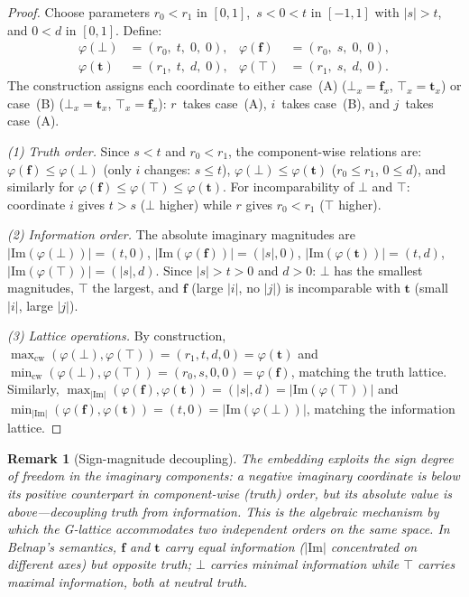 \documentclass[11pt,a4paper]{article}
\newtheorem{remark}[theorem]{Remark}
\begin{document}
\begin{proof}
Choose parameters $r_0 < r_1$ in $[0,1]$, $\, s < 0 < t$ in
$[-1,1]$ with $|s| > t$, and $0 < d$ in $[0,1]$. Define:
\begin{align*}
\varphi(\bot) &= (r_0,\; t,\; 0,\; 0), &
\varphi(\mathbf{f}) &= (r_0,\; s,\; 0,\; 0), \\
\varphi(\mathbf{t}) &= (r_1,\; t,\; d,\; 0), &
\varphi(\top) &= (r_1,\; s,\; d,\; 0).
\end{align*}
The construction assigns each coordinate to either case~(A)
($\bot_x = \mathbf{f}_x$, $\top_x = \mathbf{t}_x$) or case~(B)
($\bot_x = \mathbf{t}_x$, $\top_x = \mathbf{f}_x$):
\emph{$r$}~takes case~(A), \emph{$i$}~takes case~(B), and
\emph{$j$}~takes case~(A).

\smallskip
\emph{(1) Truth order.} Since $s < t$ and $r_0 < r_1$, the
component-wise relations are:
$\varphi(\mathbf{f}) \leq \varphi(\bot)$ (only $i$ changes:
$s \leq t$),
$\varphi(\bot) \leq \varphi(\mathbf{t})$ ($r_0 \leq r_1$,
$0 \leq d$), and similarly for $\varphi(\mathbf{f}) \leq
\varphi(\top) \leq \varphi(\mathbf{t})$. For incomparability of
$\bot$ and $\top$: coordinate $i$ gives $t > s$ ($\bot$ higher)
while $r$ gives $r_0 < r_1$ ($\top$ higher).

\smallskip
\emph{(2) Information order.} The absolute imaginary magnitudes
are $|\mathrm{Im}(\varphi(\bot))| = (t, 0)$,
$|\mathrm{Im}(\varphi(\mathbf{f}))| = (|s|, 0)$,
$|\mathrm{Im}(\varphi(\mathbf{t}))| = (t, d)$,
$|\mathrm{Im}(\varphi(\top))| = (|s|, d)$.
Since $|s| > t > 0$ and $d > 0$: $\bot$ has the smallest
magnitudes, $\top$ the largest, and $\mathbf{f}$ (large $|i|$,
no $|j|$) is incomparable with $\mathbf{t}$ (small $|i|$,
large $|j|$).

\smallskip
\emph{(3) Lattice operations.} By construction,
$\max_{\mathrm{cw}}(\varphi(\bot), \varphi(\top)) =
(r_1, t, d, 0) = \varphi(\mathbf{t})$ and
$\min_{\mathrm{cw}}(\varphi(\bot), \varphi(\top)) =
(r_0, s, 0, 0) = \varphi(\mathbf{f})$, matching the truth lattice.
Similarly,
$\max_{|\mathrm{Im}|}(\varphi(\mathbf{f}), \varphi(\mathbf{t})) =
(|s|, d) = |\mathrm{Im}(\varphi(\top))|$ and
$\min_{|\mathrm{Im}|}(\varphi(\mathbf{f}), \varphi(\mathbf{t})) =
(t, 0) = |\mathrm{Im}(\varphi(\bot))|$, matching the information
lattice.
\end{proof}

\begin{remark}[Sign-magnitude decoupling]
\label{rem:belnap-decoupling}
The embedding exploits the sign degree of freedom in the imaginary
components: a \emph{negative} imaginary coordinate is \emph{below}
its positive counterpart in component-wise (truth) order, but its
\emph{absolute value} is \emph{above}---decoupling truth from
information. This is the algebraic mechanism by which the G-lattice
accommodates two independent orders on the same space. In Belnap's
semantics, $\mathbf{f}$ and $\mathbf{t}$ carry equal information
($|\mathrm{Im}|$ concentrated on different axes) but opposite truth;
$\bot$ carries minimal information while $\top$ carries maximal
information, both at neutral truth.
\end{remark}
\end{document}

